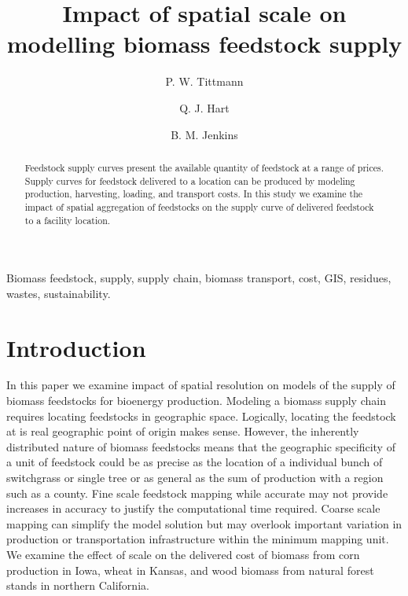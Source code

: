 \documentclass[review,3p,authoryear,times]{elsarticle}
\begin{document}

\begin{frontmatter}
\title{Impact of spatial scale on modelling biomass feedstock supply}
\author[pwt]{P. W. Tittmann}
\author[qjh]{Q. J. Hart}
\author[bmj]{B. M. Jenkins}
\address[pwt]{Geography Graduate Group, University of California, Davis}
\address[qjh]{Center for Spatial Technologies and Remote Sensing, University of California, Davis}
\address[bmj]{Energy Institute, University of California, Davis}
\begin{abstract}
Feedstock supply curves present the available quantity of feedstock at a range of prices. Supply curves for feedstock delivered to a location can be produced by modeling production, harvesting, loading, and transport costs.  In this study we examine the impact of spatial aggregation of feedstocks on the supply curve of delivered feedstock to a facility location.   
\end{abstract}
\begin{keyword}
Biomass feedstock, supply, supply chain, biomass transport, cost, GIS, residues, wastes, sustainability. 
\end{keyword}
\end{frontmatter}

\section{Introduction}
\label{sec:A1intro}
In this paper we examine impact of spatial resolution on models of the supply of biomass feedstocks for bioenergy production. Modeling a biomass supply chain requires locating feedstocks in geographic space. Logically, locating the feedstock at is real geographic point of origin makes sense. However, the inherently distributed nature of biomass feedstocks means that the geographic specificity of a unit of feedstock could be as precise as the location of a individual bunch of switchgrass or single tree or as general as the sum of production with a region such as a county. Fine scale feedstock mapping while accurate may not provide increases in accuracy to justify the computational time required. Coarse scale mapping can simplify the model solution but may overlook important variation in production or transportation infrastructure within the minimum mapping unit. We examine the effect of scale on the delivered cost of biomass from corn production in Iowa, wheat in Kansas, and wood biomass from natural forest stands in northern California.
\end{document}
